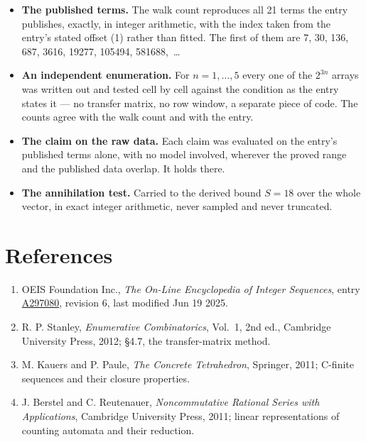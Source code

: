 \documentclass[11pt]{article}
\theoremstyle{definition}
\begin{document}
\begin{itemize}

\item {\bfseries The published terms.} The walk count reproduces all 21 terms the entry publishes, exactly, in integer arithmetic, with the index taken from the entry's stated offset (1) rather than fitted. The first of them are 7, 30, 136, 687, 3616, 19277, 105494, 581688,~\dots

\item {\bfseries An independent enumeration.} For $n = 1,\dots,5$ every one of the $2^{3n}$ arrays was written out and tested cell by cell against the condition as the entry states it --- no transfer matrix, no row window, a separate piece of code. The counts agree with the walk count and with the entry.

\item {\bfseries The claim on the raw data.} Each claim was evaluated on the entry's published terms alone, with no model involved, wherever the proved range and the published data overlap. It holds there.

\item {\bfseries The annihilation test.} Carried to the derived bound $S = 18$ over the whole vector, in exact integer arithmetic, never sampled and never truncated.

\end{itemize}

\section{References}

\begin{enumerate}

\item OEIS Foundation Inc., \emph{The On-Line Encyclopedia of Integer Sequences}, entry \href{https://oeis.org/A297080}{A297080}, revision 6, last modified Jun 19 2025.

\item R. P. Stanley, \emph{Enumerative Combinatorics}, Vol.~1, 2nd ed., Cambridge University Press, 2012; \S4.7, the transfer-matrix method.

\item M. Kauers and P. Paule, \emph{The Concrete Tetrahedron}, Springer, 2011; C-finite sequences and their closure properties.

\item J. Berstel and C. Reutenauer, \emph{Noncommutative Rational Series with Applications}, Cambridge University Press, 2011; linear representations of counting automata and their reduction.

\end{enumerate}
\end{document}
